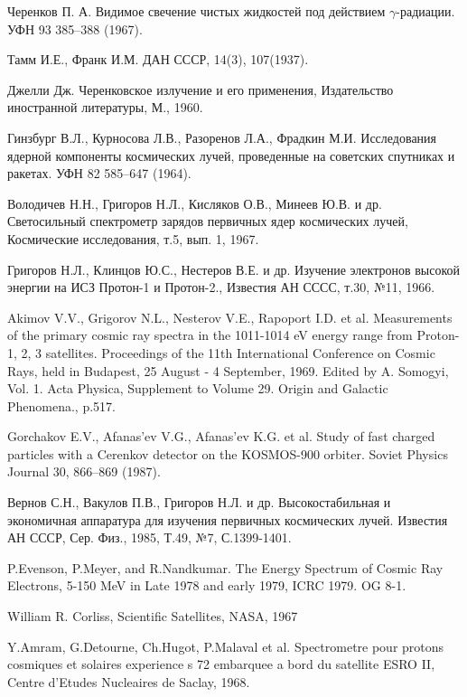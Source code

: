 \documentclass[12pt,a4paper]{report} %
\begin{document}
\begin{thebibliography}{00}

Черенков П. А. Видимое свечение чистых жидкостей под действием $\gamma$-радиации. УФН 93 385–388 (1967).

Тамм И.Е., Франк И.М. ДАН СССР, 14(3), 107(1937).

Джелли Дж.  Черенковское излучение и его применения, Издательство иностранной литературы, М., 1960.

Гинзбург В.Л., Курносова Л.В., Разоренов Л.А., Фрадкин М.И. Исследования ядерной компоненты космических лучей, проведенные на советских спутниках и ракетах. УФН 82 585–647 (1964).

Володичев Н.Н., Григоров Н.Л., Кисляков О.В., Минеев Ю.В. и др. Светосильный спектрометр зарядов первичных ядер космических лучей, Космические исследования, т.5, вып. 1, 1967.

Григоров Н.Л., Клинцов Ю.С., Нестеров В.Е. и др. Изучение электронов высокой энергии на ИСЗ Протон-1 и Протон-2., Известия АН СССС, т.30, №11, 1966.

Akimov V.V., Grigorov N.L., Nesterov V.E., Rapoport I.D. et al. Measurements of the primary cosmic ray spectra in the 1011-1014 eV energy range from Proton-1, 2, 3 satellites. Proceedings of the 11th International Conference on Cosmic Rays, held in Budapest, 25 August - 4 September, 1969. Edited by A. Somogyi, Vol. 1. Acta Physica, Supplement to Volume 29. Origin and Galactic Phenomena., p.517.

Gorchakov E.V., Afanas'ev V.G., Afanas'ev K.G. et al. Study of fast charged particles with a Cerenkov detector on the KOSMOS-900 orbiter. Soviet Physics Journal 30, 866–869 (1987).

 Вернов С.Н., Вакулов П.В., Григоров Н.Л. и др. Высокостабильная и экономичная аппаратура для изучения первичных космических лучей. Известия АН СССР, Сер. Физ., 1985, Т.49, №7, С.1399-1401.

P.Evenson, P.Meyer, and R.Nandkumar. The Energy Spectrum of Cosmic Ray Electrons, 5-150 MeV in Late 1978 and early 1979, ICRC 1979. OG 8-1.

William R. Corliss, Scientific Satellites, NASA, 1967

Y.Amram, G.Detourne, Ch.Hugot, P.Malaval et al. Spectrometre pour protons cosmiques et solaires experience s 72 embarquee a bord du satellite ESRO II, Centre d'Etudes Nucleaires de Saclay, 1968.


\end{thebibliography}
\end{document}

